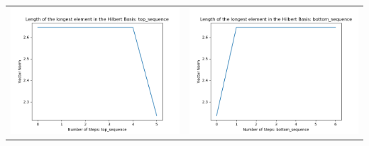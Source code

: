 \documentclass[10pt]{article}
\begin{document}
\begin{tabular}{c|c}
\begin{minipage}{.4\textwidth}
\includegraphics[width=\textwidth]{"DATA/5d/6 generators 1 bound E/top_sequence LENGTH"}
\end{minipage} &
\begin{minipage}{.4\textwidth}
\includegraphics[width=\textwidth]{"DATA/5d/6 generators 1 bound E bottomup/bottom_sequence LENGTH"}
\end{minipage}
\end{tabular}
\end{document}
